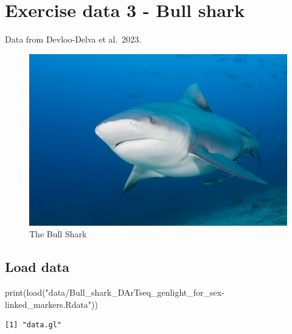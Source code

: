 \documentclass[
  letterpaper,
  DIV=11,
  numbers=noendperiod]{scrreprt}
\newenvironment{Shaded}{\begin{snugshade}}{\end{snugshade}}
\newcommand{\FunctionTok}[1]{\textcolor[rgb]{0.02,0.16,0.49}{#1}}
\newcommand{\NormalTok}[1]{\textcolor[rgb]{0.00,0.44,0.13}{#1}}
\newcommand{\StringTok}[1]{\textcolor[rgb]{0.25,0.44,0.63}{#1}}
\begin{document}
\hypertarget{exercise-data-3---bull-shark}{%
\section*{Exercise data 3 - Bull
shark}\label{exercise-data-3---bull-shark}}


Data from Devloo-Delva et al.~2023.

\begin{figure}

{\centering \includegraphics{images/Bull_Shark.jpg}

}

\caption{The Bull Shark}

\end{figure}

\hypertarget{load-data-3}{%
\subsection*{Load data}\label{load-data-3}}

\begin{Shaded}
\begin{Highlighting}[]
\FunctionTok{print}\NormalTok{(}\FunctionTok{load}\NormalTok{(}\StringTok{"data/Bull\_shark\_DArTseq\_genlight\_for\_sex{-}linked\_markers.Rdata"}\NormalTok{))}
\end{Highlighting}
\end{Shaded}

\begin{verbatim}
[1] "data.gl"
\end{verbatim}
\end{document}
